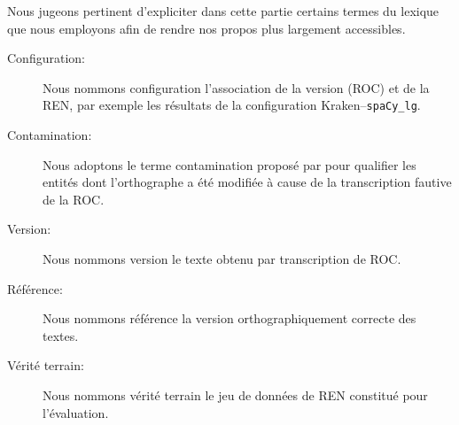 Nous jugeons pertinent d'expliciter dans cette partie certains termes du lexique que nous employons afin de rendre nos propos plus largement accessibles.

\begin{description}
    \item [Configuration:] Nous nommons configuration l'association de la version (ROC) et de la REN, par exemple les résultats de la configuration Kraken--\texttt{spaCy\_lg}.
    \item [Contamination:] Nous adoptons le terme contamination proposé par \cite{hamdi:hal-03615997} pour qualifier les entités dont l'orthographe a été modifiée à cause de la transcription fautive de la ROC.
    \item [Version:] Nous nommons version le texte obtenu par transcription de ROC.
    \item [Référence:] Nous nommons référence la version orthographiquement correcte des textes.
    \item [Vérité terrain:] Nous nommons vérité terrain le jeu de données de REN constitué pour l'évaluation. 
\end{description}


